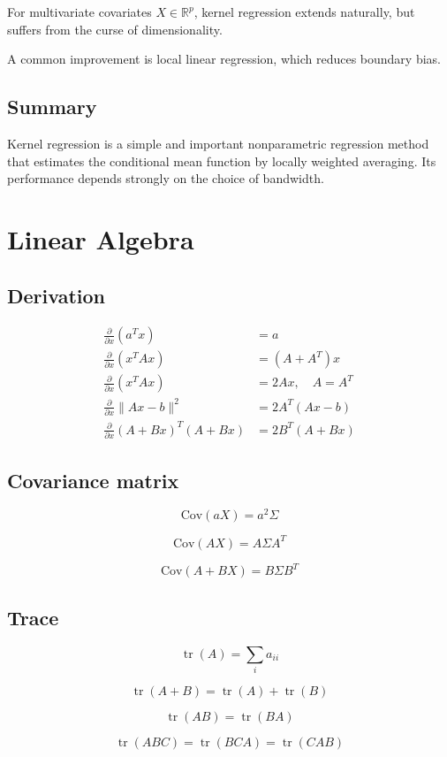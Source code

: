 \documentclass[a4paper,10pt]{article}
\begin{document}
For multivariate covariates $X\in\mathbb{R}^p$, kernel regression extends naturally, but suffers from the curse of dimensionality.

A common improvement is local linear regression, which reduces boundary bias.

\subsection{Summary}

Kernel regression is a simple and important nonparametric regression method that estimates the conditional mean function by locally weighted averaging. Its performance depends strongly on the choice of bandwidth.

\section{Linear Algebra}
\subsection{Derivation}
\[
\begin{aligned}
\frac{\partial}{\partial x}(a^T x) &= a \\
\frac{\partial}{\partial x}(x^T A x) &= (A+A^T)x \\
\frac{\partial}{\partial x}(x^T A x) &= 2Ax,\quad A=A^T \\
\frac{\partial}{\partial x}\|Ax-b\|^2 &= 2A^T(Ax-b) \\
\frac{\partial}{\partial x}(A+Bx)^T(A+Bx) &= 2B^T(A+Bx)
\end{aligned}
\] 
\subsection{Covariance matrix}
\[
\mathrm{Cov}(aX)=a^2\Sigma
\]

\[
\mathrm{Cov}(AX)=A\Sigma A^T
\]

\[
\mathrm{Cov}(A+BX)=B\Sigma B^T
\]

\subsection{Trace}
\[
\operatorname{tr}(A)=\sum_i a_{ii}
\]

\[
\operatorname{tr}(A+B)
=
\operatorname{tr}(A)+\operatorname{tr}(B)
\]

\[
\operatorname{tr}(AB)=\operatorname{tr}(BA)
\]

\[
\operatorname{tr}(ABC)
=
\operatorname{tr}(BCA)
=
\operatorname{tr}(CAB)
\]
\end{document}
